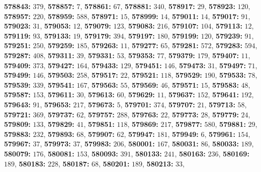 \textsf{\bfseries 578843:} $379$, \textsf{\bfseries 578857:} $7$, \textsf{\bfseries 578861:} $67$, \textsf{\bfseries 578881:} $340$, \textsf{\bfseries 578917:} $29$, \textsf{\bfseries 578923:} $120$, \textsf{\bfseries 578957:} $220$, \textsf{\bfseries 578959:} $588$, \textsf{\bfseries 578971:} $15$, \textsf{\bfseries 578999:} $14$, \textsf{\bfseries 579011:} $14$, \textsf{\bfseries 579017:} $91$, \textsf{\bfseries 579023:} $31$, \textsf{\bfseries 579053:} $12$, \textsf{\bfseries 579079:} $123$, \textsf{\bfseries 579083:} $216$, \textsf{\bfseries 579107:} $104$, \textsf{\bfseries 579113:} $12$, \textsf{\bfseries 579119:} $93$, \textsf{\bfseries 579133:} $19$, \textsf{\bfseries 579179:} $394$, \textsf{\bfseries 579197:} $180$, \textsf{\bfseries 579199:} $120$, \textsf{\bfseries 579239:} $91$, \textsf{\bfseries 579251:} $250$, \textsf{\bfseries 579259:} $185$, \textsf{\bfseries 579263:} $11$, \textsf{\bfseries 579277:} $65$, \textsf{\bfseries 579281:} $572$, \textsf{\bfseries 579283:} $594$, \textsf{\bfseries 579287:} $408$, \textsf{\bfseries 579311:} $39$, \textsf{\bfseries 579331:} $53$, \textsf{\bfseries 579353:} $77$, \textsf{\bfseries 579379:} $179$, \textsf{\bfseries 579407:} $11$, \textsf{\bfseries 579409:} $373$, \textsf{\bfseries 579427:} $164$, \textsf{\bfseries 579433:} $129$, \textsf{\bfseries 579451:} $146$, \textsf{\bfseries 579473:} $31$, \textsf{\bfseries 579497:} $71$, \textsf{\bfseries 579499:} $146$, \textsf{\bfseries 579503:} $258$, \textsf{\bfseries 579517:} $22$, \textsf{\bfseries 579521:} $118$, \textsf{\bfseries 579529:} $190$, \textsf{\bfseries 579533:} $78$, \textsf{\bfseries 579539:} $339$, \textsf{\bfseries 579541:} $167$, \textsf{\bfseries 579563:} $55$, \textsf{\bfseries 579569:} $46$, \textsf{\bfseries 579571:} $15$, \textsf{\bfseries 579583:} $48$, \textsf{\bfseries 579587:} $153$, \textsf{\bfseries 579611:} $30$, \textsf{\bfseries 579613:} $60$, \textsf{\bfseries 579629:} $11$, \textsf{\bfseries 579637:} $152$, \textsf{\bfseries 579641:} $192$, \textsf{\bfseries 579643:} $91$, \textsf{\bfseries 579653:} $217$, \textsf{\bfseries 579673:} $5$, \textsf{\bfseries 579701:} $374$, \textsf{\bfseries 579707:} $21$, \textsf{\bfseries 579713:} $58$, \textsf{\bfseries 579721:} $369$, \textsf{\bfseries 579737:} $62$, \textsf{\bfseries 579757:} $288$, \textsf{\bfseries 579763:} $22$, \textsf{\bfseries 579773:} $28$, \textsf{\bfseries 579779:} $24$, \textsf{\bfseries 579809:} $133$, \textsf{\bfseries 579829:} $41$, \textsf{\bfseries 579851:} $118$, \textsf{\bfseries 579869:} $217$, \textsf{\bfseries 579877:} $580$, \textsf{\bfseries 579881:} $29$, \textsf{\bfseries 579883:} $232$, \textsf{\bfseries 579893:} $68$, \textsf{\bfseries 579907:} $62$, \textsf{\bfseries 579947:} $181$, \textsf{\bfseries 579949:} $6$, \textsf{\bfseries 579961:} $154$, \textsf{\bfseries 579967:} $37$, \textsf{\bfseries 579973:} $37$, \textsf{\bfseries 579983:} $206$, \textsf{\bfseries 580001:} $167$, \textsf{\bfseries 580031:} $86$, \textsf{\bfseries 580033:} $189$, \textsf{\bfseries 580079:} $176$, \textsf{\bfseries 580081:} $153$, \textsf{\bfseries 580093:} $391$, \textsf{\bfseries 580133:} $241$, \textsf{\bfseries 580163:} $236$, \textsf{\bfseries 580169:} $189$, \textsf{\bfseries 580183:} $228$, \textsf{\bfseries 580187:} $68$, \textsf{\bfseries 580201:} $189$, \textsf{\bfseries 580213:} $33$, 
